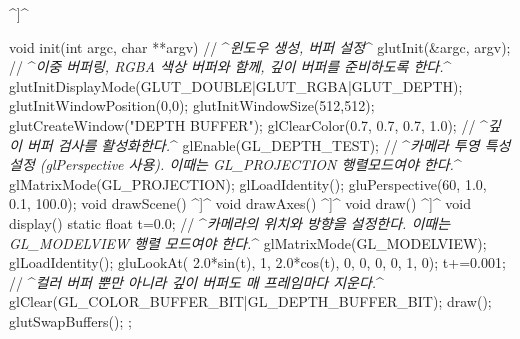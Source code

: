 ^{\sf [[헤더 파일 포함하기]]}^

void init(int argc, char **argv) {
    // ^{\it 윈도우 생성, 버퍼 설정}^
    glutInit(&argc, argv);
    // ^{\it 이중 버퍼링, RGBA 색상 버퍼와 함께, 깊이 버퍼를 준비하도록 한다.}^
    glutInitDisplayMode(GLUT_DOUBLE|GLUT_RGBA|GLUT_DEPTH);
    glutInitWindowPosition(0,0);
    glutInitWindowSize(512,512);
    glutCreateWindow("DEPTH BUFFER");
    glClearColor(0.7, 0.7, 0.7, 1.0);
    // ^{\it 깊이 버퍼 검사를 활성화한다.}^
    glEnable(GL_DEPTH_TEST);
    // ^{\it 카메라 투영 특성 설정 (glPerspective 사용). 이때는 GL\_PROJECTION 행렬모드여야 한다.}^
    glMatrixMode(GL_PROJECTION);
    glLoadIdentity();
    gluPerspective(60, 1.0, 0.1, 100.0);
}
void drawScene() {     ^{\sf [[코드 \ref{code:OGL_opengl:3DObjects}와 동일]]}^  }
void drawAxes() {     ^{\sf [[코드 \ref{code:OGL_opengl:3DObjects}와 동일]]}^ }
void draw() { ^{\sf [[코드 \ref{code:OGL_opengl:3DObjects}와 동일]]}^  }
void display() {
    static float t=0.0;
    // ^{\it 카메라의 위치와 방향을 설정한다. 이때는 GL\_MODELVIEW 행렬 모드여야 한다.}^
    glMatrixMode(GL_MODELVIEW);
    glLoadIdentity();
    gluLookAt( 2.0*sin(t), 1, 2.0*cos(t), 0, 0, 0,  0, 1, 0);
    t+=0.001;
    // ^{\it 컬러 버퍼 뿐만 아니라 깊이 버퍼도 매 프레임마다 지운다.}^
    glClear(GL_COLOR_BUFFER_BIT|GL_DEPTH_BUFFER_BIT);
    draw();
    glutSwapBuffers();
};